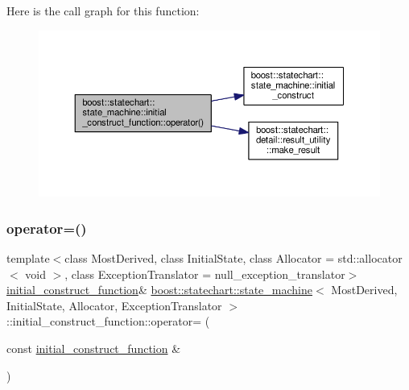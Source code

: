 Here is the call graph for this function\+:
\nopagebreak
\begin{figure}[H]
\begin{center}
\leavevmode
\includegraphics[width=350pt]{classboost_1_1statechart_1_1state__machine_1_1initial__construct__function_a01c69aaf3bd43d6b71a088781b8ee27e_cgraph}
\end{center}
\end{figure}
\mbox{\label{classboost_1_1statechart_1_1state__machine_1_1initial__construct__function_a3f60718222e2814cc1bcce67b2dcad6f}} 
\subsubsection{\texorpdfstring{operator=()}{operator=()}}
{\footnotesize\ttfamily template$<$class Most\+Derived, class Initial\+State, class Allocator = std\+::allocator$<$ void $>$, class Exception\+Translator = null\+\_\+exception\+\_\+translator$>$ \\
\mbox{\hyperlink{classboost_1_1statechart_1_1state__machine_1_1initial__construct__function}{initial\+\_\+construct\+\_\+function}}\& \mbox{\hyperlink{classboost_1_1statechart_1_1state__machine}{boost\+::statechart\+::state\+\_\+machine}}$<$ Most\+Derived, Initial\+State, Allocator, Exception\+Translator $>$\+::initial\+\_\+construct\+\_\+function\+::operator= (\begin{DoxyParamCaption}\item[{const \mbox{\hyperlink{classboost_1_1statechart_1_1state__machine_1_1initial__construct__function}{initial\+\_\+construct\+\_\+function}} \&}]{ }\end{DoxyParamCaption})\hspace{0.3cm}{\ttfamily [private]}}



